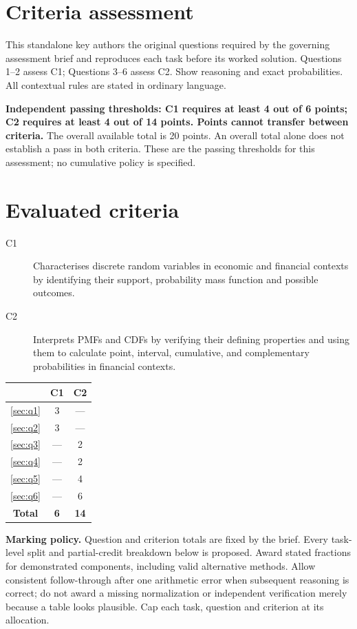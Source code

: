 \section*{Criteria assessment}
This standalone key authors the original questions required by the governing assessment brief and reproduces each task before its worked solution. Questions 1--2 assess C1; Questions 3--6 assess C2. Show reasoning and exact probabilities. All contextual rules are stated in ordinary language.

\textbf{Independent passing thresholds: C1 requires at least 4 out of 6 points; C2 requires at least 4 out of 14 points. Points cannot transfer between criteria.} The overall available total is 20 points. An overall total alone does not establish a pass in both criteria. These are the passing thresholds for this assessment; no cumulative policy is specified.
\section*{Evaluated criteria}
\begin{description}
\item[C1] Characterises discrete random variables in economic and financial contexts by identifying their support, probability mass function and possible outcomes.
\item[C2] Interprets PMFs and CDFs by verifying their defining properties and using them to calculate point, interval, cumulative, and complementary probabilities in financial contexts.
\end{description}

\begin{center}
\begin{tabular}{|c|c|c|}
	\hline\textbf{\textnumero} & \textbf{C1} & \textbf{C2} \\ \hline
	\ref*{sec:q1} & 3 & --- \\\hline
	\ref*{sec:q2} & 3 & --- \\\hline
	\ref*{sec:q3} & --- & 2 \\\hline
	\ref*{sec:q4} & --- & 2 \\\hline
	\ref*{sec:q5} & --- & 4 \\\hline
	\ref*{sec:q6} & --- & 6 \\\hline
	\textbf{Total} & \textbf{6} & \textbf{14} \\\hline
\end{tabular}
\end{center}

\textbf{Marking policy.} Question and criterion totals are fixed by the brief. Every task-level split and partial-credit breakdown below is proposed. Award stated fractions for demonstrated components, including valid alternative methods. Allow consistent follow-through after one arithmetic error when subsequent reasoning is correct; do not award a missing normalization or independent verification merely because a table looks plausible. Cap each task, question and criterion at its allocation.


